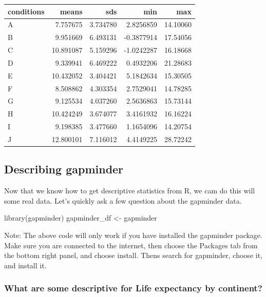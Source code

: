 \documentclass[
]{book}
\newenvironment{Shaded}{\begin{snugshade}}{\end{snugshade}}
\newcommand{\FunctionTok}[1]{\textcolor[rgb]{0.00,0.00,0.00}{#1}}
\newcommand{\NormalTok}[1]{#1}
\newcommand{\OtherTok}[1]{\textcolor[rgb]{0.56,0.35,0.01}{#1}}
\begin{document}
\begin{tabular}{l|r|r|r|r}
\hline
conditions & means & sds & min & max\\
\hline
A & 7.757675 & 3.734780 & 2.8256859 & 14.10060\\
\hline
B & 9.951669 & 6.493131 & -0.3877914 & 17.54056\\
\hline
C & 10.891087 & 5.159296 & -1.0242287 & 16.18668\\
\hline
D & 9.339941 & 6.469222 & 0.4932206 & 21.28683\\
\hline
E & 10.432052 & 3.404421 & 5.1842634 & 15.30505\\
\hline
F & 8.508862 & 4.303354 & 2.7529041 & 14.78285\\
\hline
G & 9.125534 & 4.037260 & 2.5636863 & 15.73144\\
\hline
H & 10.424249 & 3.674077 & 3.4161932 & 16.16224\\
\hline
I & 9.198385 & 3.477660 & 1.1654096 & 14.20754\\
\hline
J & 12.800101 & 7.116012 & 4.4149225 & 28.72242\\
\hline
\end{tabular}

\hypertarget{describing-gapminder}{%
\subsection{Describing gapminder}\label{describing-gapminder}}

Now that we know how to get descriptive statistics from R, we cam do this will some real data. Let's quickly ask a few question about the gapminder data.

\begin{Shaded}
\begin{Highlighting}[]
\FunctionTok{library}\NormalTok{(gapminder)}
\NormalTok{gapminder\_df }\OtherTok{\textless{}{-}}\NormalTok{ gapminder}
\end{Highlighting}
\end{Shaded}

Note: The above code will only work if you have installed the gapminder package. Make sure you are connected to the internet, then choose the Packages tab from the bottom right panel, and choose install. Thens search for gapminder, choose it, and install it.

\hypertarget{what-are-some-descriptive-for-life-expectancy-by-continent}{%
\subsubsection{What are some descriptive for Life expectancy by continent?}\label{what-are-some-descriptive-for-life-expectancy-by-continent}}
\end{document}
